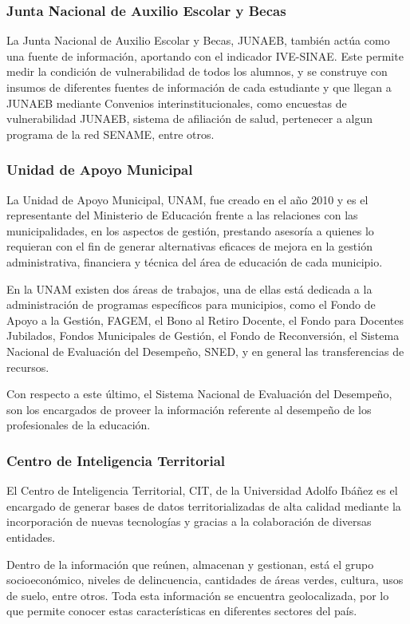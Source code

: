 \subsubsection{Junta Nacional de Auxilio Escolar y Becas}
La Junta Nacional de Auxilio Escolar y Becas, JUNAEB, también actúa como una fuente de información, aportando con el indicador IVE-SINAE. Este permite medir la condición de vulnerabilidad de todos los alumnos, y se construye con insumos de diferentes fuentes de información de cada estudiante y que llegan a JUNAEB mediante Convenios interinstitucionales, como encuestas de vulnerabilidad JUNAEB, sistema de afiliación de salud, pertenecer a algun programa de la red SENAME, entre otros. 

\subsubsection{Unidad de Apoyo Municipal}
La Unidad de Apoyo Municipal, UNAM, fue creado en el año 2010 y es el representante del Ministerio de Educación frente a las relaciones con las municipalidades, en los aspectos de gestión, prestando asesoría a quienes lo requieran con el fin de generar alternativas eficaces de mejora en la gestión administrativa, financiera y técnica del área de educación de cada municipio.

En la UNAM existen dos áreas de trabajos, una de ellas está dedicada a la administración de programas específicos para municipios, como el Fondo de Apoyo a la Gestión, FAGEM, el Bono al Retiro Docente, el Fondo para Docentes Jubilados, Fondos Municipales de Gestión, el Fondo de Reconversión, el Sistema Nacional de Evaluación del Desempeño, SNED, y en general las transferencias de recursos.  

Con respecto a este último, el Sistema Nacional de Evaluación del Desempeño, son los encargados de proveer la información referente al desempeño de los profesionales de la educación. 

\subsubsection{Centro de Inteligencia Territorial}
El Centro de Inteligencia Territorial, CIT, de la Universidad Adolfo Ibáñez es el encargado de generar bases de datos territorializadas de alta calidad mediante la incorporación de nuevas tecnologías y gracias a la colaboración de diversas entidades. 

Dentro de la información que reúnen, almacenan y gestionan, está el grupo socioeconómico, niveles de delincuencia, cantidades de áreas verdes, cultura, usos de suelo, entre otros. Toda esta información se encuentra geolocalizada, por lo que permite conocer estas características en diferentes sectores del país.

